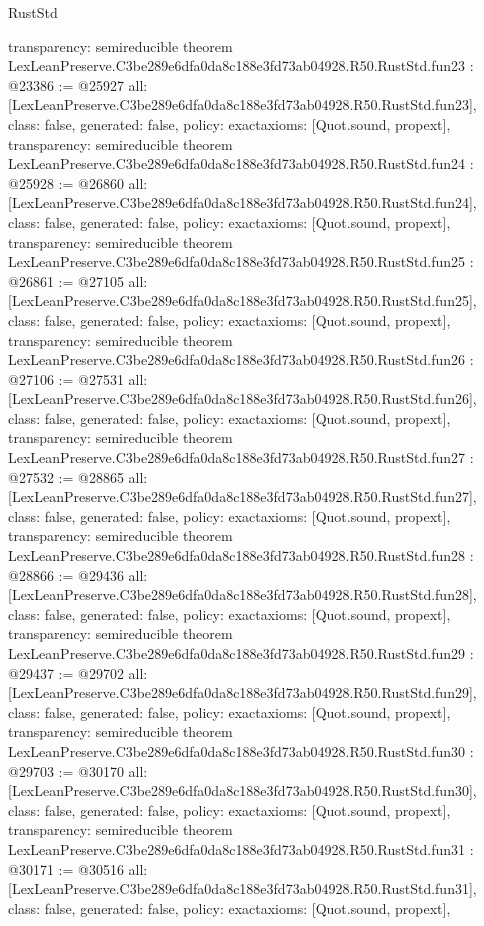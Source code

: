 \begin{lexlean}{RustStd}
\begin{coremodule}
{  transparency: semireducible
}
theorem LexLeanPreserve.C3be289e6dfa0da8c188e3fd73ab04928.R50.RustStd.fun23 : @23386 := @25927 {
  all: [LexLeanPreserve.C3be289e6dfa0da8c188e3fd73ab04928.R50.RustStd.fun23],
  class: false,
  generated: false,
  policy: exact{axioms: [Quot.sound, propext]},
  transparency: semireducible
}
theorem LexLeanPreserve.C3be289e6dfa0da8c188e3fd73ab04928.R50.RustStd.fun24 : @25928 := @26860 {
  all: [LexLeanPreserve.C3be289e6dfa0da8c188e3fd73ab04928.R50.RustStd.fun24],
  class: false,
  generated: false,
  policy: exact{axioms: [Quot.sound, propext]},
  transparency: semireducible
}
theorem LexLeanPreserve.C3be289e6dfa0da8c188e3fd73ab04928.R50.RustStd.fun25 : @26861 := @27105 {
  all: [LexLeanPreserve.C3be289e6dfa0da8c188e3fd73ab04928.R50.RustStd.fun25],
  class: false,
  generated: false,
  policy: exact{axioms: [Quot.sound, propext]},
  transparency: semireducible
}
theorem LexLeanPreserve.C3be289e6dfa0da8c188e3fd73ab04928.R50.RustStd.fun26 : @27106 := @27531 {
  all: [LexLeanPreserve.C3be289e6dfa0da8c188e3fd73ab04928.R50.RustStd.fun26],
  class: false,
  generated: false,
  policy: exact{axioms: [Quot.sound, propext]},
  transparency: semireducible
}
theorem LexLeanPreserve.C3be289e6dfa0da8c188e3fd73ab04928.R50.RustStd.fun27 : @27532 := @28865 {
  all: [LexLeanPreserve.C3be289e6dfa0da8c188e3fd73ab04928.R50.RustStd.fun27],
  class: false,
  generated: false,
  policy: exact{axioms: [Quot.sound, propext]},
  transparency: semireducible
}
theorem LexLeanPreserve.C3be289e6dfa0da8c188e3fd73ab04928.R50.RustStd.fun28 : @28866 := @29436 {
  all: [LexLeanPreserve.C3be289e6dfa0da8c188e3fd73ab04928.R50.RustStd.fun28],
  class: false,
  generated: false,
  policy: exact{axioms: [Quot.sound, propext]},
  transparency: semireducible
}
theorem LexLeanPreserve.C3be289e6dfa0da8c188e3fd73ab04928.R50.RustStd.fun29 : @29437 := @29702 {
  all: [LexLeanPreserve.C3be289e6dfa0da8c188e3fd73ab04928.R50.RustStd.fun29],
  class: false,
  generated: false,
  policy: exact{axioms: [Quot.sound, propext]},
  transparency: semireducible
}
theorem LexLeanPreserve.C3be289e6dfa0da8c188e3fd73ab04928.R50.RustStd.fun30 : @29703 := @30170 {
  all: [LexLeanPreserve.C3be289e6dfa0da8c188e3fd73ab04928.R50.RustStd.fun30],
  class: false,
  generated: false,
  policy: exact{axioms: [Quot.sound, propext]},
  transparency: semireducible
}
theorem LexLeanPreserve.C3be289e6dfa0da8c188e3fd73ab04928.R50.RustStd.fun31 : @30171 := @30516 {
  all: [LexLeanPreserve.C3be289e6dfa0da8c188e3fd73ab04928.R50.RustStd.fun31],
  class: false,
  generated: false,
  policy: exact{axioms: [Quot.sound, propext]},
}
\end{coremodule}
\end{lexlean}
